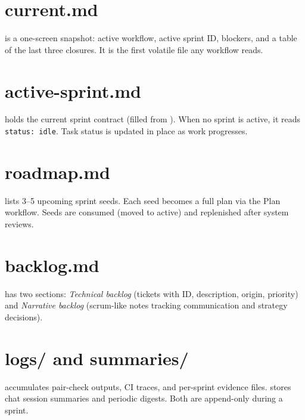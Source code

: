 \documentclass[a4paper,11pt,openany]{report}
\begin{document}
\section{current.md}

 is a one-screen snapshot: active workflow, active
sprint ID, blockers, and a table of the last three closures. It is the first
volatile file any workflow reads.

\section{active-sprint.md}

 holds the current sprint contract (filled from
). When no sprint is active, it reads
\texttt{status: idle}. Task status is updated in place as work progresses.

\section{roadmap.md}

 lists 3--5 upcoming sprint seeds. Each seed becomes
a full plan via the Plan workflow. Seeds are consumed (moved to active) and
replenished after system reviews.

\section{backlog.md}

 has two sections: \emph{Technical backlog} (tickets
with ID, description, origin, priority) and \emph{Narrative backlog} (scrum-like
notes tracking communication and strategy decisions).

\section{logs/ and summaries/}

 accumulates pair-check outputs, CI traces, and per-sprint
evidence files.  stores chat session summaries and
periodic digests. Both are append-only during a sprint.

\end{document}
